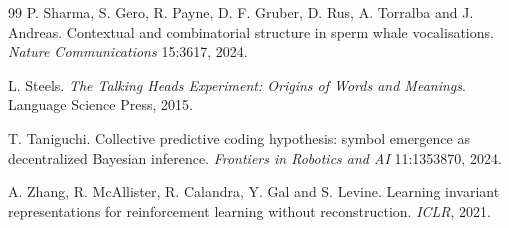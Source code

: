 \begin{thebibliography}{99}
 P. Sharma, S. Gero, R. Payne, D. F. Gruber, D. Rus, A. Torralba and
J. Andreas. Contextual and combinatorial structure in sperm whale vocalisations.
\emph{Nature Communications} 15:3617, 2024.

 L. Steels. \emph{The Talking Heads Experiment: Origins of Words and
Meanings}. Language Science Press, 2015.

 T. Taniguchi. Collective predictive coding hypothesis: symbol
emergence as decentralized Bayesian inference. \emph{Frontiers in Robotics and AI}
11:1353870, 2024.

 A. Zhang, R. McAllister, R. Calandra, Y. Gal and S. Levine. Learning
invariant representations for reinforcement learning without reconstruction. \emph{ICLR},
2021.

\end{thebibliography}
